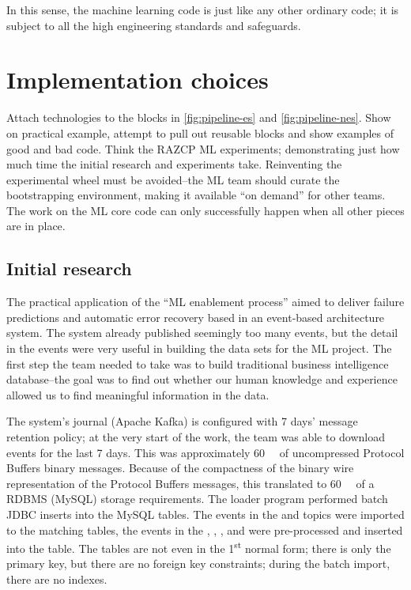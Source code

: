 In this sense, the machine learning code is just like any other ordinary code; it is subject to all the high engineering standards and safeguards.

\section{Implementation choices}
Attach technologies to the blocks in \autoref{fig:pipeline-es} and \autoref{fig:pipeline-nes}. Show on practical example, attempt to pull out reusable blocks and show examples of good and bad code. Think the RAZCP ML experiments; demonstrating just how much time the initial research and experiments take. Reinventing the experimental wheel must be avoided--the ML team should curate the bootstrapping environment, making it available ``on demand'' for other teams. The work on the ML core code can only successfully happen when all other pieces are in place. 

\subsection{Initial research}
The practical application of the ``ML enablement process'' aimed to deliver failure predictions and automatic error recovery based in an event-based architecture system. The system already published seemingly too many events, but the detail in the events were very useful in building the data sets for the ML project. The first step the team needed to take was to build traditional business intelligence database--the goal was to find out whether our human knowledge and experience allowed us to find meaningful information in the data.

The system's journal (Apache Kafka\cite{kafka}) is configured with 7 days' message retention policy; at the very start of the work, the team was able to download events for the last 7 days. This was approximately \SI{60}{\gibi\byte} of uncompressed Protocol Buffers\cite{protobuf} binary messages. Because of the compactness of the binary wire representation of the Protocol Buffers messages, this translated to \SI{60}{\gibi\byte} of a RDBMS (MySQL\cite{mysql}) storage requirements. The loader program performed batch JDBC inserts into the MySQL tables. The events in the  and  topics were imported to the matching tables, the events in the , , , and  were pre-processed and inserted into the  table. The tables are not even in the 1\textsuperscript{st} normal form; there is only the primary key, but there are no foreign key constraints; during the batch import, there are no indexes. 


